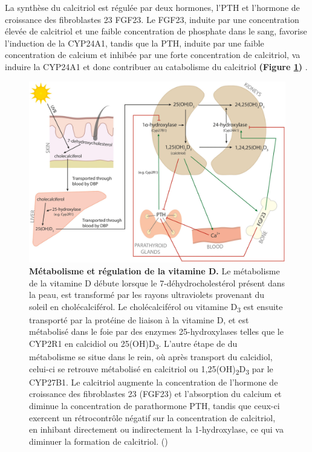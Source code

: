 \documentclass[
  a4paper,
  DIV=11,
  numbers=noendperiod,
  listof=totoc]{scrreprt}
\begin{document}
La synthèse du calcitriol est régulée par deux hormones, l'\ac{PTH} et
l'hormone de croissance des fibroblastes 23 \acs{FGF23}. Le \ac{FGF23},
induite par une concentration élevée de calcitriol et une faible
concentration de phosphate dans le sang, favorise l'induction de la
\ac{CYP24A1}, tandis que la \ac{PTH}, induite par une faible
concentration de calcium et inhibée par une forte concentration de
calcitriol, va induire la \ac{CYP24A1} et donc contribuer au catabolisme
du calcitriol \textbf{(Figure \ref{fig:reg-vitd})}
\autocite{Dankers.2017,Christakos.2010}.

\begin{figure}
\includegraphics{figures/vitamin-d-metabolism-regulation.jpg} 
\caption[\textbf{Métabolisme et régulation de la vitamine D.}]
{\textbf{Métabolisme et régulation de la vitamine D.} Le métabolisme de la vitamine D débute lorsque le 7-déhydrocholestérol présent dans la peau, est transformé par les rayons ultraviolets provenant du soleil en cholécalciférol. Le cholécalciférol ou vitamine D\textsubscript{3} est ensuite transporté par la protéine de liaison à la vitamine D, et est métabolisé dans le foie par des enzymes 25-hydroxylases telles que le CYP2R1 en calcidiol ou 25(OH)D\textsubscript{3}. L'autre étape de du métabolisme se situe dans le rein, où après transport du calcidiol, celui-ci se retrouve métabolisé en calcitriol ou 1,25(OH)\textsubscript{2}D\textsubscript{3} par le CYP27B1. Le calcitriol augmente la concentration de l'hormone de croissance des fibroblastes 23 (FGF23) et l'absorption du calcium et diminue la concentration de parathormone \ac{PTH}, tandis que ceux-ci exercent un rétrocontrôle négatif sur la concentration de calcitriol, en inhibant directement ou indirectement la 1-hydroxylase, ce qui va diminuer la formation de calcitriol. (\cite{Dankers.2017})}
\label{fig:reg-vitd}
\end{figure}
\end{document}
